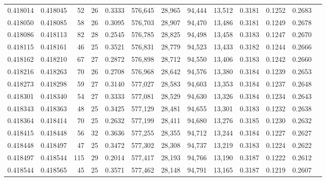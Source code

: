 \begin{tabular}{rrrrrrrrrrrrr}
0.418014 & 0.418045 &    52 &  26 &                                     0.3333 & 576,645 &  28,965 &  94,444 &  13,512 & 0.3181 & 0.1252 & 0.2683 \\
0.418050 & 0.418085 &    58 &  26 &                                     0.3095 & 576,703 &  28,907 &  94,470 &  13,486 & 0.3181 & 0.1249 & 0.2678 \\
0.418086 & 0.418113 &    82 &  28 &                                     0.2545 & 576,785 &  28,825 &  94,498 &  13,458 & 0.3183 & 0.1247 & 0.2670 \\
0.418115 & 0.418161 &    46 &  25 &                                     0.3521 & 576,831 &  28,779 &  94,523 &  13,433 & 0.3182 & 0.1244 & 0.2666 \\
0.418162 & 0.418210 &    67 &  27 &                                     0.2872 & 576,898 &  28,712 &  94,550 &  13,406 & 0.3183 & 0.1242 & 0.2660 \\
0.418216 & 0.418263 &    70 &  26 &                                     0.2708 & 576,968 &  28,642 &  94,576 &  13,380 & 0.3184 & 0.1239 & 0.2653 \\
0.418273 & 0.418298 &    59 &  27 &                                     0.3140 & 577,027 &  28,583 &  94,603 &  13,353 & 0.3184 & 0.1237 & 0.2648 \\
0.418301 & 0.418340 &    54 &  27 &                                     0.3333 & 577,081 &  28,529 &  94,630 &  13,326 & 0.3184 & 0.1234 & 0.2643 \\
0.418343 & 0.418363 &    48 &  25 &                                     0.3425 & 577,129 &  28,481 &  94,655 &  13,301 & 0.3183 & 0.1232 & 0.2638 \\
0.418364 & 0.418414 &    70 &  25 &                                     0.2632 & 577,199 &  28,411 &  94,680 &  13,276 & 0.3185 & 0.1230 & 0.2632 \\
0.418415 & 0.418448 &    56 &  32 &                                     0.3636 & 577,255 &  28,355 &  94,712 &  13,244 & 0.3184 & 0.1227 & 0.2627 \\
0.418448 & 0.418497 &    47 &  25 &                                     0.3472 & 577,302 &  28,308 &  94,737 &  13,219 & 0.3183 & 0.1224 & 0.2622 \\
0.418497 & 0.418544 &   115 &  29 &                                     0.2014 & 577,417 &  28,193 &  94,766 &  13,190 & 0.3187 & 0.1222 & 0.2612 \\
0.418544 & 0.418565 &    45 &  25 &                                     0.3571 & 577,462 &  28,148 &  94,791 &  13,165 & 0.3187 & 0.1219 & 0.2607 \\

\end{tabular}
